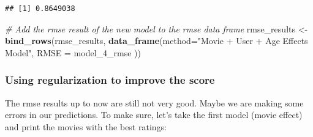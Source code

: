 \documentclass[]{article}
\newenvironment{Shaded}{\begin{snugshade}}{\end{snugshade}}
\newcommand{\KeywordTok}[1]{\textcolor[rgb]{0.13,0.29,0.53}{\textbf{#1}}}
\newcommand{\DataTypeTok}[1]{\textcolor[rgb]{0.13,0.29,0.53}{#1}}
\newcommand{\DecValTok}[1]{\textcolor[rgb]{0.00,0.00,0.81}{#1}}
\newcommand{\StringTok}[1]{\textcolor[rgb]{0.31,0.60,0.02}{#1}}
\newcommand{\CommentTok}[1]{\textcolor[rgb]{0.56,0.35,0.01}{\textit{#1}}}
\newcommand{\OperatorTok}[1]{\textcolor[rgb]{0.81,0.36,0.00}{\textbf{#1}}}
\newcommand{\NormalTok}[1]{#1}
\begin{document}
\begin{verbatim}
## [1] 0.8649038
\end{verbatim}

\begin{Shaded}
\begin{Highlighting}[]
\CommentTok{# Add the rmse result of the new model to the rmse data frame}
\NormalTok{rmse_results <-}\StringTok{ }\KeywordTok{bind_rows}\NormalTok{(rmse_results,}
                          \KeywordTok{data_frame}\NormalTok{(}\DataTypeTok{method=}\StringTok{"Movie + User + Age Effects Model"}\NormalTok{,  }
                                     \DataTypeTok{RMSE =}\NormalTok{ model_4_rmse ))}
\end{Highlighting}
\end{Shaded}

\subsubsection{Using regularization to improve the
score}\label{using-regularization-to-improve-the-score}

The rmse results up to now are still not very good. Maybe we are making
some errors in our predictions. To make sure, let's take the first model
(movie effect) and print the movies with the best ratings:

\begin{Shaded}
\end{Shaded}
\end{document}
